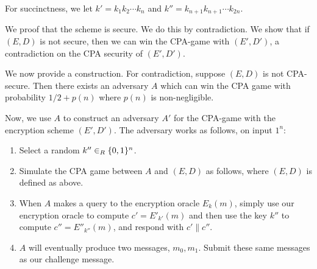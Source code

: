 \documentclass{article}
\begin{document}
\begin{enumerate}[,label=\alph*.]
For succinctness, we let $k' = k_1k_2\cdots k_n$ and $k'' = k_{n+1}k_{n+1} \cdots k_{2n}$.%

We proof that the scheme is secure. We do this by contradiction. We show that if $(E,D)$ is not secure,
then we can win the CPA-game with $(E',D')$, a contradiction on the CPA security of $(E',D')$.%

We now provide a construction.
For contradiction, suppose $(E,D)$ is not CPA-secure. Then there exists an adversary $A$ which can 
win the CPA game with probability $1/2 + p(n)$ where $p(n)$ is non-negligible. 
 
Now, we use $A$ to construct an adversary $A'$ for the CPA-game with the encryption scheme $(E',D')$.
The adversary works as follows, on input $1^n$:%

\begin{enumerate}[noitemsep,topsep=\mdcompacttopsep]%

\item{}Select a random $k'' \in_R \{0,1\}^n$.%

\item{}Simulate the CPA game between $A$ and $(E,D)$ as follows, where $(E,D)$ is defined as above.%

\item{}When $A$ makes a query to the encryption oracle $E_k(m)$, simply use our encryption oracle 
to compute $c' = E'_{k'}(m)$ and then use the key $k''$ to compute $c'' = E''_{k''}(m)$, and
respond with $c' \| c''$.%

\item{}$A$ will eventually produce two messages, $m_0,m_1$. Submit these same messages as our
challenge message.%


\end{enumerate}
\end{enumerate}
\end{document}
